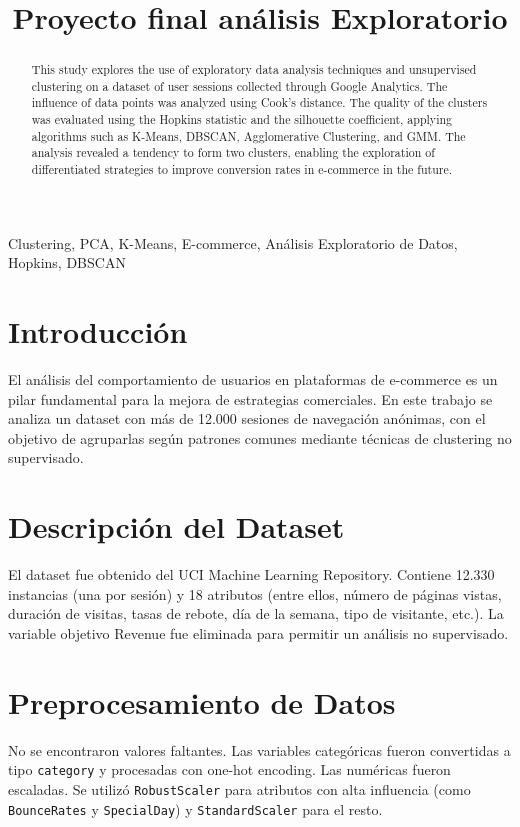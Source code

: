 \documentclass[conference]{IEEEtran}
\title{Proyecto final análisis Exploratorio}
\author{
    \IEEEauthorblockN{Leopoldo Muñoz, Valentina Yáñez}
    \IEEEauthorblockA{
        Universidad de Talca \\
        Facultad de Ingeniería \\
        \texttt{leom18@alumnos.utalca.cl, vyanez20@alumnos.utalca.cl}
    }
}
\begin{document}
\maketitle

\begin{abstract}
This study explores the use of exploratory data analysis techniques and unsupervised clustering on a dataset of user sessions collected through Google Analytics. The influence of data points was analyzed using Cook's distance. The quality of the clusters was evaluated using the Hopkins statistic and the silhouette coefficient, applying algorithms such as K-Means, DBSCAN, Agglomerative Clustering, and GMM. The analysis revealed a tendency to form two clusters, enabling the exploration of differentiated strategies to improve conversion rates in e-commerce in the future.
\end{abstract}

\begin{IEEEkeywords}
Clustering, PCA, K-Means, E-commerce, Análisis Exploratorio de Datos, Hopkins, DBSCAN
\end{IEEEkeywords}

\section{Introducción}
El análisis del comportamiento de usuarios en plataformas de e-commerce es un pilar fundamental para la mejora de estrategias comerciales. En este trabajo se analiza un dataset con más de 12.000 sesiones de navegación anónimas, con el objetivo de agruparlas según patrones comunes mediante técnicas de clustering no supervisado.

\section{Descripción del Dataset}
El dataset fue obtenido del UCI Machine Learning Repository. Contiene 12.330 instancias (una por sesión) y 18 atributos (entre ellos, número de páginas vistas, duración de visitas, tasas de rebote, día de la semana, tipo de visitante, etc.). La variable objetivo Revenue fue eliminada para permitir un análisis no supervisado.

\section{Preprocesamiento de Datos}
No se encontraron valores faltantes. Las variables categóricas fueron convertidas a tipo \texttt{category} y procesadas con one-hot encoding. Las numéricas fueron escaladas. Se utilizó \texttt{RobustScaler} para atributos con alta influencia (como \texttt{BounceRates} y \texttt{SpecialDay}) y \texttt{StandardScaler} para el resto.
\end{document}
